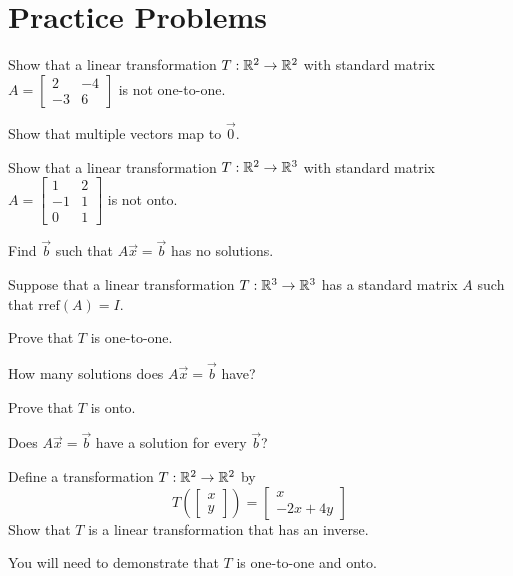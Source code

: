\documentclass{ximera}
\begin{document}
\section*{Practice Problems}
\begin{problem}\label{prob:inverses1}
Show that a linear transformation $T:\mathbb{R}^2\rightarrow \mathbb{R}^2$ with standard matrix $A=\begin{bmatrix}2&-4\\-3&6\end{bmatrix}$ is not one-to-one.
\begin{hint}
        Show that multiple vectors map to $\vec{0}$.
      \end{hint}
\end{problem}
 
 \begin{problem}\label{prob:inverses2}
 Show that a linear transformation $T:\mathbb{R}^2\rightarrow \mathbb{R}^3$ with standard matrix $A=\begin{bmatrix}1&2\\-1&1\\0&1\end{bmatrix}$ is not onto.
 \begin{hint}
 Find $\vec{b}$ such that $A\vec{x}=\vec{b}$ has no solutions.
 \end{hint}
 \end{problem}
 
 \begin{problem}\label{prob:inverses3}
 Suppose that a linear transformation $T:\mathbb{R}^3\rightarrow \mathbb{R}^3$ has a standard matrix $A$ such that $\text{rref}(A)=I$.
 
 Prove that $T$ is one-to-one.
 \begin{hint}
 How many solutions does $A\vec{x}=\vec{b}$ have?
 \end{hint}
 Prove that $T$ is onto.
 \begin{hint}
 Does $A\vec{x}=\vec{b}$ have a solution for every $\vec{b}$?
 \end{hint}
 \end{problem}
 
 \begin{problem}\label{prob:inverses4}
 Define a transformation $T:\mathbb{R}^2\rightarrow \mathbb{R}^2$ by 
 $$T\left(\begin{bmatrix}x\\y\end{bmatrix}\right)=\begin{bmatrix}x\\-2x+4y\end{bmatrix}$$
 Show that $T$ is a linear transformation that has an inverse.
 \begin{hint}
You will need to demonstrate that $T$ is one-to-one and onto.
 \end{hint}
 \end{problem}
 
\end{document}
